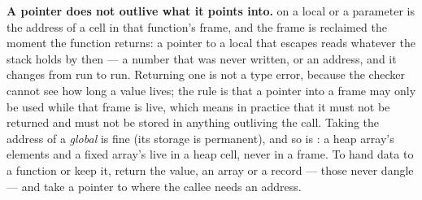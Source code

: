 \noindent\textbf{A pointer does not outlive what it points into.}
 on a local or a parameter is the address of a cell in that
function's frame, and the frame is reclaimed the moment the function
returns: a pointer to a local that escapes reads whatever the stack
holds by then --- a number that was never written, or an address, and
it changes from run to run. Returning one is not a type error,
because the checker cannot see how long a value lives; the rule is that
a pointer into a frame may only be used while that frame is live, which
means in practice that it must not be returned and must not be stored
in anything outliving the call. Taking the address of a \emph{global}
is fine (its storage is permanent), and so is : a heap
array's elements and a fixed array's live in a heap cell, never in a
frame. To hand data to a function or keep it, return the value, an
array or a record --- those never dangle --- and take a pointer to
 where the callee needs an address.
